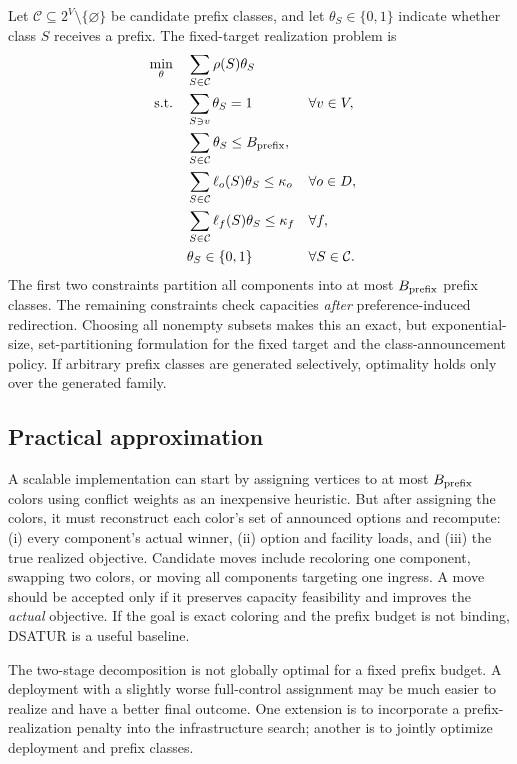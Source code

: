 \documentclass[10pt,a4paper]{article}
\begin{document}
Let $\mathcal C\subseteq2^V\setminus\{\varnothing\}$ be candidate prefix classes, and let $\theta_S\in\{0,1\}$ indicate whether class $S$ receives a prefix. The fixed-target realization problem is
\begin{equation}\label{eq:partition}
\begin{aligned}
\min_{\theta}\quad&\sum_{S\in\mathcal C}\rho(S)\theta_S\\
\text{s.t.}\quad&\sum_{S\ni v}\theta_S=1 &&\forall v\in V,\\
&\sum_{S\in\mathcal C}\theta_S\le B_{\rm prefix},\\
&\sum_{S\in\mathcal C}\ell_o(S)\theta_S\le\kappa_o &&\forall o\in D,\\
&\sum_{S\in\mathcal C}\ell_f(S)\theta_S\le\kappa_f &&\forall f,\\
&\theta_S\in\{0,1\} &&\forall S\in\mathcal C.
\end{aligned}
\end{equation}
The first two constraints partition all components into at most $B_{\rm prefix}$ prefix classes. The remaining constraints check capacities \emph{after} preference-induced redirection. Choosing all nonempty subsets makes this an exact, but exponential-size, set-partitioning formulation for the fixed target and the class-announcement policy. If arbitrary prefix classes are generated selectively, optimality holds only over the generated family.

\subsection{Practical approximation}

A scalable implementation can start by assigning vertices to at most $B_{\rm prefix}$ colors using conflict weights as an inexpensive heuristic. But after assigning the colors, it must reconstruct each color's set of announced options and recompute: (i) every component's actual winner, (ii) option and facility loads, and (iii) the true realized objective. Candidate moves include recoloring one component, swapping two colors, or moving all components targeting one ingress. A move should be accepted only if it preserves capacity feasibility and improves the \emph{actual} objective. If the goal is exact coloring and the prefix budget is not binding, DSATUR is a useful baseline.

The two-stage decomposition is not globally optimal for a fixed prefix budget. A deployment with a slightly worse full-control assignment may be much easier to realize and have a better final outcome. One extension is to incorporate a prefix-realization penalty into the infrastructure search; another is to jointly optimize deployment and prefix classes.
\end{document}
